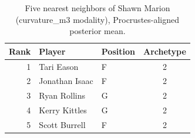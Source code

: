 \begin{table}[htbp]
  \centering\small
  \begin{tabular}{rllc}
    \toprule
    Rank & Player & Position & Archetype \\
    \midrule
    1 & Tari Eason & F & 2 \\
    2 & Jonathan Isaac & F & 2 \\
    3 & Ryan Rollins & G & 2 \\
    4 & Kerry Kittles & G & 2 \\
    5 & Scott Burrell & F & 2 \\
    \bottomrule
  \end{tabular}
  \caption{Five nearest neighbors of Shawn Marion (curvature_m3 modality), Procrustes-aligned posterior mean.}
  \label{tab:Shawn_Marion_neighbors_curvature_m3}
\end{table}

